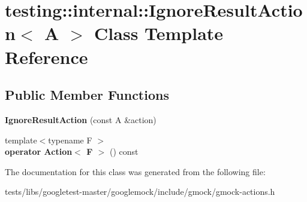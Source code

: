 \hypertarget{classtesting_1_1internal_1_1IgnoreResultAction}{}\section{testing\+:\+:internal\+:\+:Ignore\+Result\+Action$<$ A $>$ Class Template Reference}
\label{classtesting_1_1internal_1_1IgnoreResultAction}
\subsection*{Public Member Functions}
\begin{DoxyCompactItemize}
\item 
\mbox{\label{classtesting_1_1internal_1_1IgnoreResultAction_a9199f7b1b7771b2e2a5fd28caf624623}} 
{\bfseries Ignore\+Result\+Action} (const A \&action)
\item 
\mbox{\label{classtesting_1_1internal_1_1IgnoreResultAction_affb8b7439604c860e1416f45339c6e37}} 
{\footnotesize template$<$typename F $>$ }\\{\bfseries operator Action$<$ F $>$} () const
\end{DoxyCompactItemize}


The documentation for this class was generated from the following file\+:\begin{DoxyCompactItemize}
\item 
tests/libs/googletest-\/master/googlemock/include/gmock/gmock-\/actions.\+h\end{DoxyCompactItemize}
